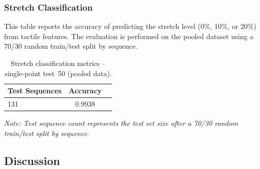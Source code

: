 \documentclass[11pt,a4paper]{article}
\begin{document}
\subsubsection{Stretch Classification}
This table reports the accuracy of predicting the stretch level (0\%, 10\%, or 20\%) from tactile
features. The evaluation is performed on the pooled dataset using a 70/30 random train/test split by sequence.

\begin{table}[H]
    \centering
    \caption{Stretch classification metrics – single-point test~50 (pooled data).}
    \label{tab:stretch-single}
    \begin{tabular}{@{}lcc@{}}
        \toprule
        Test Sequences & Accuracy \\
        \midrule
        131 & 0.9938 \\
        \bottomrule
    \end{tabular}
    \vspace{0.1cm}
    \footnotesize
    \textit{Note: Test sequence count represents the test set size after a 70/30 random train/test split by sequence.}
\end{table}

\subsection{Discussion}
\end{document}
